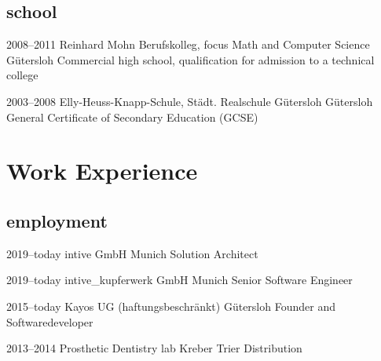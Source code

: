 \documentclass[]{friggeri-cv} %
\begin{document}
\subsection{school}

	\begin{entrylist}
	
	\entry
	{2008--2011}
	{Reinhard Mohn Berufskolleg, focus Math and Computer Science}
	{G\"{u}tersloh}
	{Commercial high school, qualification for admission to a technical college}
	
	
	\entry
	{2003--2008}
	{Elly-Heuss-Knapp-Schule, St\"{a}dt. Realschule G\"{u}tersloh}
	{G\"{u}tersloh}
	{General Certificate of Secondary Education (GCSE)}
	
%	
%	

\end{entrylist}


\section{Work Experience}

\subsection{employment}

	
	\begin{entrylist}
		
	\entry
	{2019--today}
	{intive GmbH}
	{Munich}
	{Solution Architect}
	
	
	\entry
	{2019--today}
	{intive\_kupferwerk GmbH}
	{Munich}
	{Senior Software Engineer}
		
	
	\entry
	{2015--today}
	{Kayos UG (haftungsbeschr\"{a}nkt)}
	{G\"{u}tersloh}
	{Founder and Softwaredeveloper}

	
	\entry
	{2013--2014}
	{Prosthetic Dentistry lab Kreber}
	{Trier}
	{Distribution}


\end{entrylist}
\end{document}
